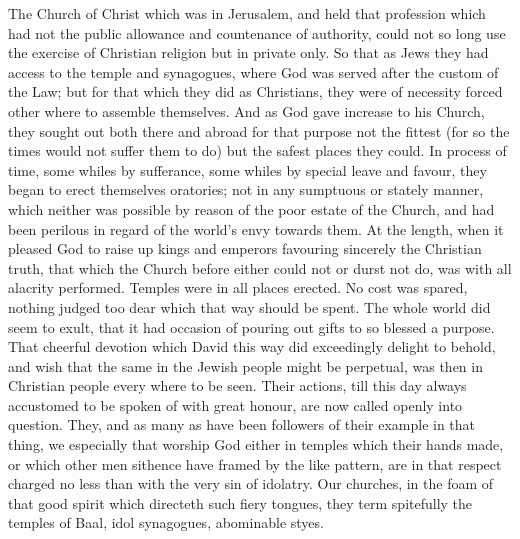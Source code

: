 The Church of Christ which was in Jerusalem, and held that profession which had not the public allowance and countenance of authority, could not so long use the exercise of Christian religion but in private only. So that as Jews they had access to the temple and synagogues, where God was served after the custom of the Law; but for that which they did as Christians, they were of necessity forced other where to assemble themselves. And as God gave increase to his Church, they sought out both there and abroad for that purpose not the fittest (for so the times would not suffer them to do) but the safest places they could. In process of time, some whiles by sufferance, some whiles by special leave and favour, they began to erect themselves oratories; not in any sumptuous or stately manner, which neither was possible by reason of the poor estate of the Church, and had been perilous in regard of the world’s envy towards them. At the length, when it pleased God to raise up kings and emperors favouring sincerely the Christian truth, that which the Church before either could not or durst not do, was with all alacrity performed. Temples were in all places erected. No cost was spared, nothing judged too dear which that way should be spent. The whole world did seem to exult, that it had occasion of pouring out gifts to so blessed a purpose. That cheerful devotion which David this way did exceedingly delight to behold, and wish that the same in the Jewish people might be perpetual, was then in Christian people every where to be seen.
Their actions, till this day always accustomed to be spoken of with great honour, are now called openly into question. They, and as many as have been followers of their example in that thing, we especially that worship God either in temples which their hands made, or which other men  sithence have framed by the like pattern, are in that respect charged no less than with the very sin of idolatry. Our churches, in the foam of that good spirit which directeth such fiery tongues, they term spitefully the temples of Baal, idol synagogues, abominable styes.

